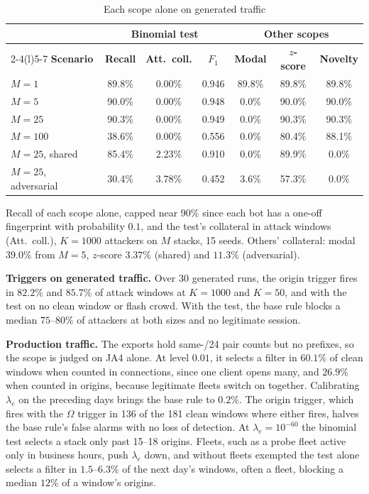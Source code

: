 \documentclass[conference,letterpaper,10pt]{IEEEtran}
\newcommand\1{\textit{(i)}}
\newcommand\2{\textit{(ii)}}
\newcommand\3{\textit{(iii)}}
\newcommand\4{\textit{(iv)}}
\newcommand\5{\textit{(v)}}
\newcommand\6{\textit{(vi)}}
\newcommand\7{\textit{(vii)}}
\newcommand\8{\textit{(viii)}}
\newcommand\9{\textit{(ix)}}
\begin{document}
\begin{table}[t]
\centering
\caption{Each scope alone on generated traffic}
\label{tab:symbolic}
\scriptsize
\setlength{\tabcolsep}{1.6pt}
\begin{tabular}{@{}lcccccc@{}}
\toprule
 & \multicolumn{3}{c}{\textbf{Binomial test}} & \multicolumn{3}{c}{\textbf{Other scopes}} \\
\cmidrule(lr){2-4}\cmidrule(l){5-7}
\textbf{Scenario} & \textbf{Recall} & \textbf{Att.\ coll.} & \textbf{$F_1$} & \textbf{Modal} & \textbf{$z$-score} & \textbf{Novelty} \\
\midrule
$M{=}1$               & 89.8\% & 0.00\% & 0.946 & 89.8\% & 89.8\% & 89.8\% \\
$M{=}5$               & 90.0\% & 0.00\% & 0.948 & 0.0\% & 90.0\% & 90.0\% \\
$M{=}25$              & 90.3\% & 0.00\% & 0.949 & 0.0\% & 90.3\% & 90.3\% \\
$M{=}100$             & 38.6\% & 0.00\% & 0.556 & 0.0\% & 80.4\% & 88.1\% \\
$M{=}25$, shared      & 85.4\% & 2.23\% & 0.910 & 0.0\% & 89.9\% & 0.0\% \\
$M{=}25$, adversarial & 30.4\% & 3.78\% & 0.452 & 3.6\% & 57.3\% & 0.0\% \\
\bottomrule
\end{tabular}

\vspace{2pt}
\begin{minipage}{\linewidth}\footnotesize Recall of each scope alone, capped near $90\%$ since each bot has a one-off fingerprint with probability $0.1$, and the test's collateral in attack windows (Att.\ coll.), $K = 1000$ attackers on $M$ stacks, 15 seeds. Others' collateral: modal $39.0\%$ from $M{=}5$, $z$-score $3.37\%$ (shared) and $11.3\%$ (adversarial).\end{minipage}
\end{table}

\textbf{Triggers on generated traffic.} Over 30 generated runs, the origin trigger fires in $82.2\%$ and $85.7\%$ of attack windows at $K = 1000$ and $K = 50$, and with the test on no clean window or flash crowd. With the test, the base rule blocks a median $75$--$80\%$ of attackers at both sizes and no legitimate session.

\textbf{Production traffic.} The exports hold same-/24 pair counts but no prefixes, so the scope is judged on JA4 alone. At level $0.01$, it selects a filter in $60.1\%$ of clean windows when counted in connections, since one client opens many, and $26.9\%$ when counted in origins, because legitimate fleets switch on together. Calibrating $\lambda_e$ on the preceding days brings the base rule to $0.2\%$. The origin trigger, which fires with the $\Omega$ trigger in 136 of the 181 clean windows where either fires, halves the base rule's false alarms with no loss of detection. At $\lambda_e = 10^{-60}$ the binomial test selects a stack only past 15--18 origins. Fleets, such as a probe fleet active only in business hours, push $\lambda_e$ down, and without fleets exempted the test alone selects a filter in $1.5$--$6.3\%$ of the next day's windows, often a fleet, blocking a median $12\%$ of a window's origins.
\end{document}
